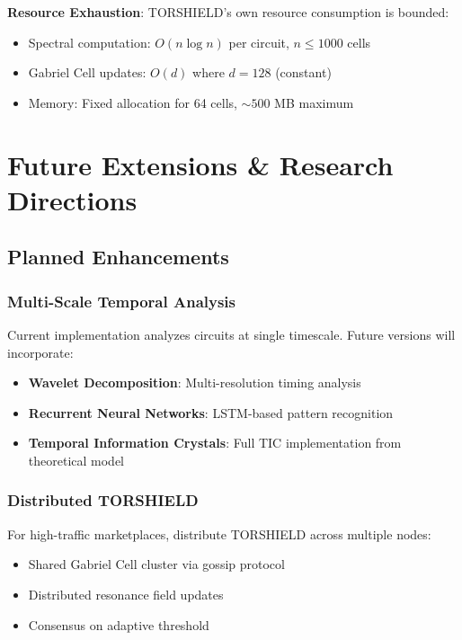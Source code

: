 \documentclass[11pt,a4paper]{article}
\begin{document}
\textbf{Resource Exhaustion}:
TORSHIELD's own resource consumption is bounded:
\begin{itemize}
\item Spectral computation: $O(n \log n)$ per circuit, $n \leq 1000$ cells
\item Gabriel Cell updates: $O(d)$ where $d = 128$ (constant)
\item Memory: Fixed allocation for 64 cells, $\sim 500$ MB maximum
\end{itemize}

\newpage
\section{Future Extensions \& Research Directions}

\subsection{Planned Enhancements}

\subsubsection{Multi-Scale Temporal Analysis}

Current implementation analyzes circuits at single timescale. Future versions will incorporate:
\begin{itemize}
\item \textbf{Wavelet Decomposition}: Multi-resolution timing analysis
\item \textbf{Recurrent Neural Networks}: LSTM-based pattern recognition
\item \textbf{Temporal Information Crystals}: Full TIC implementation from theoretical model
\end{itemize}

\subsubsection{Distributed TORSHIELD}

For high-traffic marketplaces, distribute TORSHIELD across multiple nodes:
\begin{itemize}
\item Shared Gabriel Cell cluster via gossip protocol
\item Distributed resonance field updates
\item Consensus on adaptive threshold
\end{itemize}
\end{document}
